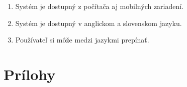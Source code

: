 \documentclass[hreffootnote]{zah}
\begin{document}
\begin{enumerate}
\item Systém je dostupný z počítača aj mobilných zariadení.
\item Systém je dostupný v anglickom a slovenskom jazyku.
\item Používateľ si môže medzi jazykmi prepínať.
\end{enumerate}

\label{reqs}

\cleardoublepage
\section{Prílohy}
\end{document}
